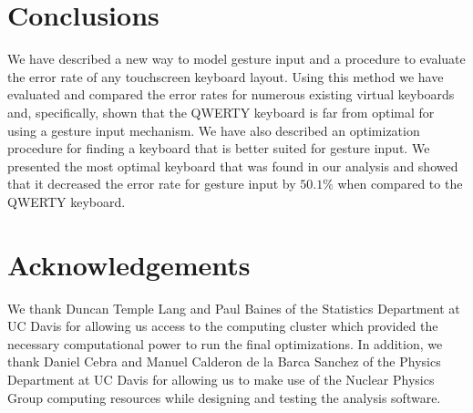 \documentclass[final,1p,times,authoryear]{elsarticle}
\begin{document}
\section{\textbf{Conclusions}}\label{sec:Conclusions}

We have described a new way to model gesture input and
a procedure to evaluate the error rate of any touchscreen
keyboard layout. Using this method we have evaluated and compared the error rates for numerous
existing virtual keyboards and, specifically, shown that the QWERTY keyboard
is far from optimal for using a gesture input mechanism. We have also
described an optimization procedure for finding a keyboard that is better suited for gesture input.
We presented the most optimal keyboard that was found in our analysis
 and showed that it decreased the error rate for gesture input
by $50.1\%$ when compared to the QWERTY keyboard.


\section*{Acknowledgements}
We thank Duncan Temple Lang and Paul Baines of the Statistics
Department at UC Davis for allowing us access to the computing cluster
which provided the necessary computational power to run the final
optimizations. In addition, we thank Daniel Cebra and Manuel
Calderon de la Barca Sanchez of the Physics Department at UC Davis
for allowing us to make use of the Nuclear Physics Group computing 
resources while designing and testing the analysis software.
\end{document}
